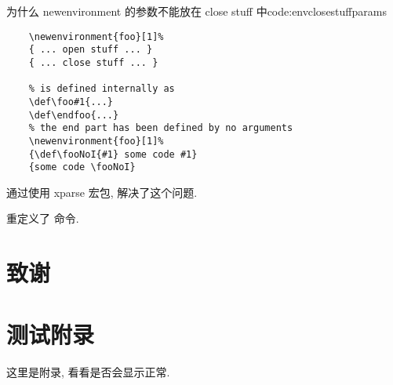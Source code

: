 \documentclass{cugrep}
\begin{document}
\begin{tcodeenv}{为什么 newenvironment 的参数不能放在 close stuff 中}{code:envclosestuffparams}
    \begin{verbatim}
    \newenvironment{foo}[1]%
    { ... open stuff ... }
    { ... close stuff ... }

    % is defined internally as
    \def\foo#1{...}
    \def\endfoo{...}
    % the end part has been defined by no arguments
    \newenvironment{foo}[1]%
    {\def\fooNoI{#1} some code #1}
    {some code \fooNoI}
    \end{verbatim}
\end{tcodeenv}

通过使用 xparse 宏包, 解决了这个问题.

重定义了  命令.
\backmatter

\chapter{致谢}

\appendix
\chapter{测试附录}
这里是附录, 看看是否会显示正常.

\backmatter 
\end{document}

